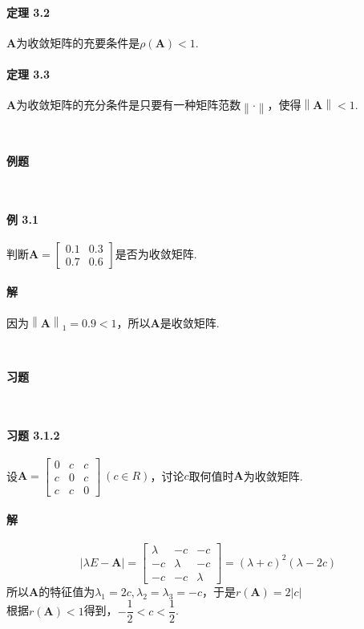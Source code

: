 \documentclass[12pt, a4paper, oneside, fontset=none]{ctexart}
\begin{document}
\paragraph*{定理 3.2} $\bm{A}$为收敛矩阵的充要条件是$\rho(\bm{A}) < 1$.

\paragraph*{定理 3.3} $\bm{A}$为收敛矩阵的充分条件是只要有一种矩阵范数$\left\lVert \bm{\cdot}\right\rVert$，使得$\left\lVert \bm{A}\right\rVert < 1$.

\par \ \par

\centerline{\large{\textbf{例题}}} \ \par

\paragraph*{例 3.1} 判断$\bm{A} = \begin{bmatrix}
        0.1 & 0.3 \\
        0.7 & 0.6
    \end{bmatrix} 是否为收敛矩阵$.

\paragraph*{解} 因为$\left\lVert \bm{A}\right\rVert _1 = 0.9 < 1$，所以$\bm{A}$是收敛矩阵.

\par \ \par

\centerline{\large{\textbf{习题}}} \ \par

\paragraph*{习题 3.1.2} 设$\bm{A} = \begin{bmatrix}
        0 & c & c \\
        c & 0 & c \\
        c & c & 0
    \end{bmatrix}\ (c \in R)$，讨论$c$取何值时$\bm{A}$为收敛矩阵.

\paragraph*{解}
\[
    |\lambda E - \bm{A}| = \begin{bmatrix}
        \lambda & -c      & -c      \\
        -c      & \lambda & -c      \\
        -c      & -c      & \lambda
    \end{bmatrix} = (\lambda + c)^2(\lambda - 2c)
\]
所以$\bm{A}$的特征值为$\lambda_1 = 2c,\lambda_2 = \lambda_3 = -c$，于是$r(\bm{A}) = 2|c|$\\
根据$r(\bm{A}) < 1$得到，$-\dfrac{1}{2} < c < \dfrac{1}{2}$.
\end{document}
